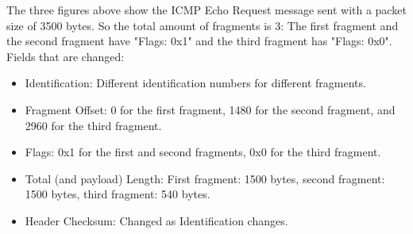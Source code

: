\documentclass{article}
\begin{document}
\begin{CJK*}{UTF8}{gbsn}
\begin{figure}[H]
\end{figure}
The three figures above show the ICMP Echo Request message sent with a packet size of 3500 bytes.
So the total amount of fragments is 3:
The first fragment and the second fragment have "Flags: 0x1" and the third fragment has "Flags: 0x0".
Fields that are changed:
\begin{itemize}
    \item Identification: Different identification numbers for different fragments.
    \item Fragment Offset: 0 for the first fragment, 1480 for the second fragment, and 2960 for the third fragment.
    \item Flags: 0x1 for the first and second fragments, 0x0 for the third fragment.
    \item Total (and payload) Length: First fragment: 1500 bytes, second fragment: 1500 bytes, third fragment: 540 bytes.
    \item Header Checksum: Changed as Identification changes.
\end{itemize}
\end{CJK*}
\end{document}
